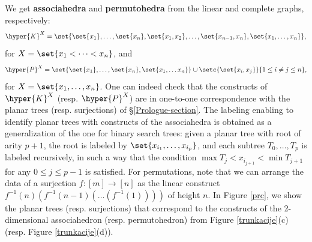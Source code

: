 \begin{example}\label{asper}
We  get {\bf associahedra} and {\bf permutohedra} from the  linear  and complete graphs, respectively: 
$$
\hyper{K}^X= \set{\set{x_1},\ldots,\set{x_n},\set{x_1,x_2},\ldots,\set{x_{n-1},x_n},\set{x_1,\ldots, x_n}},$$
for  $X=\set{x_1<\cdots<x_n}$, and
$$\hyper{P}^X= \set{\set{x_1},\ldots,\set{x_n},\set{x_1,\ldots x_n}} \cup \setc{\set{x_i,x_j}}{1\leq i\neq j\leq n},$$
for $X=\set{x_1,\ldots,x_n}$. One can indeed check that the constructs of $\hyper{K}^X$ (resp. $\hyper{P}^X$) are in one-to-one correspondence with  the planar trees (resp.  surjections) of \S\ref{Prologue-section}. The labeling enabling to identify planar trees with constructs of the associahedra is obtained as a generalization of the one for binary search trees: given a planar tree with root of arity $p+1$, the root is labeled by $\set{x_{i_1}, \ldots, x_{i_p}}$, and each subtree $T_0, \ldots, T_p$ is labeled recursively, in such a way that the condition $\max T_j <x_{i_{j+1}}< \min T_{j+1}$ for any $0 \leq j \leq p-1$ is satisfied.
For permutations, note that we can arrange the data of a surjection $f:[m]\rightarrow[n]$ as the linear construct $f^{-1}(n)(f^{-1}(n-1)(\ldots  (f^{-1}(1))))$ of height $n$. In Figure \ref{prc}, we show the planar trees (resp. surjections) that correspond to the constructs of the 2-dimensional associahedron (resp. permutohedron) from Figure \ref{trunkacije}(c) (resp. Figure \ref{trunkacije}(d)).
\begin{figure}
\end{figure}
\end{example}
